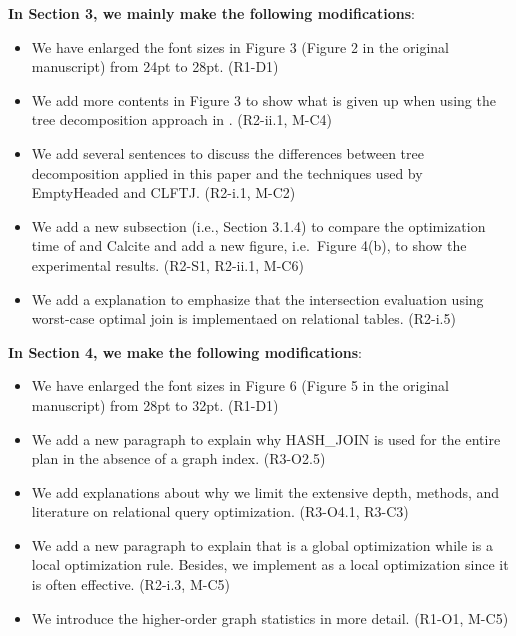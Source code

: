 \textbf{In Section 3, we mainly make the following modifications}:
\begin{itemize}
	\item We have enlarged the font sizes in Figure 3 (Figure 2 in the original manuscript) from 24pt to 28pt. (R1-D1)
	\item We add more contents in Figure 3 to show what is given up when using the tree decomposition approach in \name. (R2-ii.1, M-C4)
	\item We add several sentences to discuss the differences between tree decomposition applied in this paper and the techniques used by EmptyHeaded and CLFTJ. (R2-i.1, M-C2)
	\item We add a new subsection (i.e., Section 3.1.4) to compare the optimization time of \name and Calcite and add a new figure, i.e.~Figure 4(b), to show the experimental results. (R2-S1, R2-ii.1, M-C6)
	\item We add a explanation to emphasize that the intersection evaluation using worst-case optimal join is implementaed on relational tables. (R2-i.5)
\end{itemize}

\textbf{In Section 4, we make the following modifications}:
\begin{itemize}
	\item We have enlarged the font sizes in Figure 6 (Figure 5 in the original manuscript) from 28pt to 32pt. (R1-D1)
	\item We add a new paragraph to explain why HASH\_JOIN is used for the entire plan in the absence of a graph index. (R3-O2.5)
	\item We add explanations about why we limit the extensive depth, methods, and literature on relational query optimization. (R3-O4.1, R3-C3)
	\item We add a new paragraph to explain that \filterrule is a global optimization while \fusionrule is a local optimization rule. Besides, we implement \filterrule as a local optimization since it is often effective. (R2-i.3, M-C5)
	\item We introduce the higher-order graph statistics in more detail. (R1-O1, M-C5)
\end{itemize}

